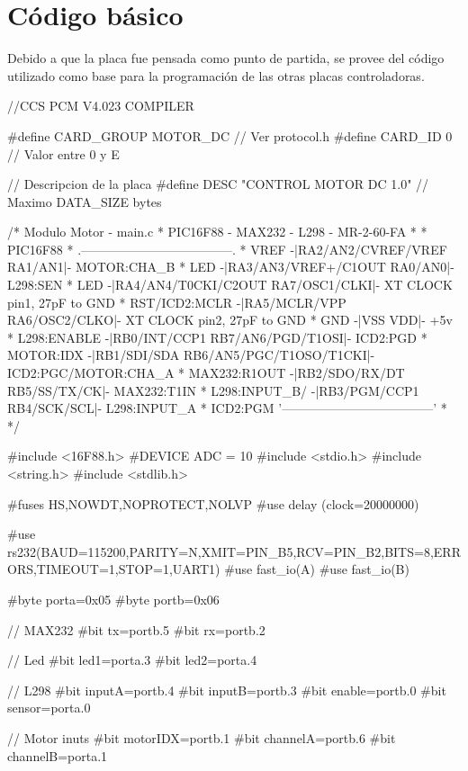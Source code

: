 \documentclass[a4paper,10pt]{article}
\begin{document}
\section{C\'odigo b\'asico}
\label{codigo}

Debido a que la placa fue pensada como punto de partida, se provee del c\'odigo utilizado como base para la programaci\'on de las otras placas controladoras.

{\scriptsize
\begin{verbatimtab}
//CCS PCM V4.023 COMPILER

#define CARD_GROUP	MOTOR_DC	// Ver protocol.h
#define CARD_ID		0		// Valor entre 0 y E

// Descripcion de la placa
#define DESC		"CONTROL MOTOR DC 1.0" // Maximo DATA_SIZE bytes

/* Modulo Motor - main.c
 * PIC16F88 - MAX232 - L298 - MR-2-60-FA
 *
 *                               PIC16F88
 *                .------------------------------------.
 *          VREF -|RA2/AN2/CVREF/VREF           RA1/AN1|- MOTOR:CHA_B
 *           LED -|RA3/AN3/VREF+/C1OUT          RA0/AN0|- L298:SEN
 *           LED -|RA4/AN4/T0CKI/C2OUT    RA7/OSC1/CLKI|- XT CLOCK pin1, 27pF to GND
 * RST/ICD2:MCLR -|RA5/MCLR/VPP           RA6/OSC2/CLKO|- XT CLOCK pin2, 27pF to GND
 *           GND -|VSS                              VDD|- +5v
 *   L298:ENABLE -|RB0/INT/CCP1       RB7/AN6/PGD/T1OSI|- ICD2:PGD
 *     MOTOR:IDX -|RB1/SDI/SDA  RB6/AN5/PGC/T1OSO/T1CKI|- ICD2:PGC/MOTOR:CHA_A
 *  MAX232:R1OUT -|RB2/SDO/RX/DT           RB5/SS/TX/CK|- MAX232:T1IN
 * L298:INPUT_B/ -|RB3/PGM/CCP1             RB4/SCK/SCL|- L298:INPUT_A
 *     ICD2:PGM   '------------------------------------'
 *    
 */

#include <16F88.h>
#DEVICE ADC = 10
#include <stdio.h>
#include <string.h>
#include <stdlib.h>

#fuses HS,NOWDT,NOPROTECT,NOLVP
#use delay (clock=20000000)

#use rs232(BAUD=115200,PARITY=N,XMIT=PIN_B5,RCV=PIN_B2,BITS=8,ERRORS,TIMEOUT=1,STOP=1,UART1)
#use fast_io(A)
#use fast_io(B)

#byte porta=0x05
#byte portb=0x06

// MAX232
#bit tx=portb.5
#bit rx=portb.2

// Led
#bit led1=porta.3
#bit led2=porta.4

// L298
#bit inputA=portb.4
#bit inputB=portb.3
#bit enable=portb.0
#bit sensor=porta.0

// Motor inuts
#bit motorIDX=portb.1
#bit channelA=portb.6
#bit channelB=porta.1


\end{verbatimtab}}
\end{document}
